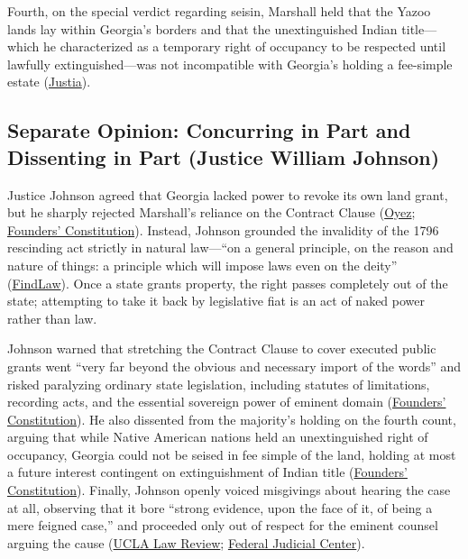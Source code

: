 \documentclass[12pt]{article}
\begin{document}
Fourth, on the special verdict regarding seisin, Marshall held that the Yazoo lands lay within Georgia's borders and that the unextinguished Indian title---which he characterized as a temporary right of occupancy to be respected until lawfully extinguished---was not incompatible with Georgia's holding a fee-simple estate (\href{https://supreme.justia.com/cases/federal/us/10/87/}{Justia}).

\subsection{Separate Opinion: Concurring in Part and Dissenting in Part (Justice William Johnson)}

Justice Johnson agreed that Georgia lacked power to revoke its own land grant, but he sharply rejected Marshall's reliance on the Contract Clause (\href{https://www.oyez.org/cases/1789-1850/10us87}{Oyez}; \href{https://press-pubs.uchicago.edu/founders/documents/a1_10_1s12.html}{Founders' Constitution}). Instead, Johnson grounded the invalidity of the 1796 rescinding act strictly in natural law---``on a general principle, on the reason and nature of things: a principle which will impose laws even on the deity'' (\href{https://caselaw.findlaw.com/court/us-supreme-court/10/87.html}{FindLaw}). Once a state grants property, the right passes completely out of the state; attempting to take it back by legislative fiat is an act of naked power rather than law.

Johnson warned that stretching the Contract Clause to cover executed public grants went ``very far beyond the obvious and necessary import of the words'' and risked paralyzing ordinary state legislation, including statutes of limitations, recording acts, and the essential sovereign power of eminent domain (\href{https://press-pubs.uchicago.edu/founders/documents/a1_10_1s12.html}{Founders' Constitution}). He also dissented from the majority's holding on the fourth count, arguing that while Native American nations held an unextinguished right of occupancy, Georgia could not be seised in fee simple of the land, holding at most a future interest contingent on extinguishment of Indian title (\href{https://press-pubs.uchicago.edu/founders/documents/a1_10_1s12.html}{Founders' Constitution}). Finally, Johnson openly voiced misgivings about hearing the case at all, observing that it bore ``strong evidence, upon the face of it, of being a mere feigned case,'' and proceeded only out of respect for the eminent counsel arguing the cause (\href{https://www.uclalawreview.org/wp-content/uploads/2019/09/12_52UCLALRev2892004-2005.pdf}{UCLA Law Review}; \href{https://www.fjc.gov/history/cases/cases-that-shaped-the-federal-courts/fletcher-v-peck}{Federal Judicial Center}).
\end{document}
